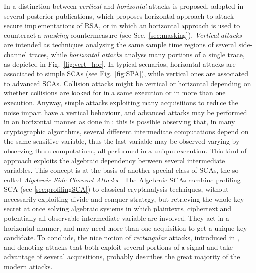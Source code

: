 In \cite{clavier2010horizontal} a distinction between \emph{vertical} and \emph{horizontal} attacks is proposed, adopted in several posterior publications, \eg \cite{bauer2013horizontal} which proposes horizontal approach to attack secure implementations of RSA, or \cite{battistello2016horizontal} in which an horizontal approach is used to counteract a \emph{masking} countermeasure (see Sec.~\ref{sec:masking}). \emph{Vertical attacks} are intended as techniques analysing the same sample time regions of several side-channel traces, while \emph{horizontal attacks} analyse many portions of a single trace, as depicted in Fig.~\ref{fig:vert_hor}. In typical scenarios,  horizontal attacks are associated to simple SCAs (see \eg Fig.~\ref{fig:SPA}), while vertical ones are associated to advanced SCAs. Collision attacks might be vertical or horizontal depending on whether collisions are looked for in a same execution or in more than one execution.  Anyway, simple attacks exploiting many acquisitions to reduce the noise impact have a vertical behaviour, and advanced attacks may be performed in an horizontal manner as done \eg in \cite{battistello2016horizontal}: this is possible observing that, in many cryptographic algorithms, several different intermediate computations depend on the same sensitive variable, thus the last variable may be observed varying by observing those computations, all performed in a unique execution. This kind of approach exploits the algebraic dependency between several intermediate variables. This concept is at the basis of another special class of SCAs, the so-called \emph{Algebraic Side-Channel Attacks} \cite{ASCA,renauld2009algebraic,Oren:2013,Oren2014,soft}. The Algebraic SCAs combine profiling SCA (see \ref{sec:profilingSCA}) to classical cryptanalysis techniques, \ie without necessarily exploiting divide-and-conquer strategy, but retrieving the whole key secret at once solving algebraic systems in which plaintexts, ciphertext and potentially all observable intermediate variable are involved. They act in a horizontal manner, and may need more than one acquisition to get a unique key candidate. To conclude, the nice notion of \emph{rectangular} attacks, introduced in \cite{bauer2013horizontal}, and denoting attacks that both exploit several portions of a signal and take advantage of several acquisitions, probably describes the great majority of the modern attacks. 


